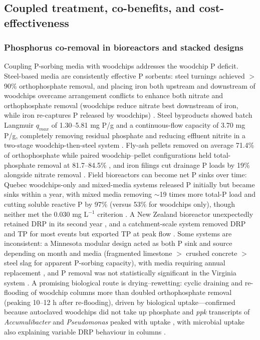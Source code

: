 \subsection{Coupled treatment, co-benefits, and cost-effectiveness}

\subsubsection{Phosphorus co-removal in bioreactors and stacked designs}

Coupling P-sorbing media with woodchips addresses the woodchip P deficit. Steel-based media are consistently effective P sorbents: steel turnings achieved $>$90\% orthophosphate removal, and placing iron both upstream and downstream of woodchips overcame arrangement conflicts to enhance both nitrate and orthophosphate removal (woodchips reduce nitrate best downstream of iron, while iron re-captures P released by woodchips) \parencite{Goodwin2015}. Steel byproducts showed batch Langmuir $q_{max}$ of 1.30--5.81 mg P/g and a continuous-flow capacity of 3.70 mg P/g, completely removing residual phosphate and reducing effluent nitrite in a two-stage woodchip-then-steel system \parencite{Hua2016}. Fly-ash pellets removed on average 71.4\% of orthophosphate while paired woodchip--pellet configurations held total-phosphate removal at 81.7--84.5\% \parencite{Li2018b}, and iron filings cut drainage P loads by 19\% alongside nitrate removal \parencite{Oladeji2023}. Field bioreactors can become net P sinks over time: Quebec woodchips-only and mixed-media systems released P initially but became sinks within a year, with mixed media removing $\sim$19 times more total-P load and cutting soluble reactive P by 97\% (versus 53\% for woodchips only), though neither met the 0.030 mg L$^{-1}$ criterion \parencite{Husk2018}. A New Zealand bioreactor unexpectedly retained DRP in its second year \parencite{Rivas2020}, and a catchment-scale system removed DRP and TP for most events but exported TP at peak flow \parencite{Feyereisen2023}. Some systems are inconsistent: a Minnesota modular design acted as both P sink and source depending on month and media (fragmented limestone $>$ crushed concrete $>$ steel slag for apparent P-sorbing capacity), with media requiring annual replacement \parencite{Strock2025}, and P removal was not statistically significant in the Virginia system \parencite{Bock2018}. A promising biological route is drying--rewetting: cyclic draining and re-flooding of woodchip columns more than doubled orthophosphate removal (peaking 10--12 h after re-flooding), driven by biological uptake---confirmed because autoclaved woodchips did not take up phosphate and \textit{ppk} transcripts of \textit{Accumulibacter} and \textit{Pseudomonas} peaked with uptake \parencite{Zhang2024b}, with microbial uptake also explaining variable DRP behaviour in columns \parencite{Soupir2018}.

